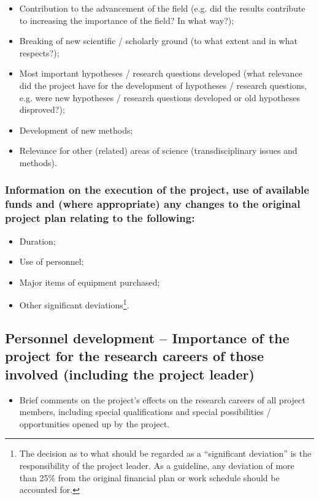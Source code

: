 \documentclass[a4paper, 11pt]{article}
\begin{document}
\begin{itemize}
\item Contribution to the advancement of the field (e.g. did the results contribute to
increasing the importance of the field? In what way?);
\item Breaking of new scientific / scholarly ground (to what extent and in what
respects?); 
\item Most important hypotheses / research questions developed (what relevance did the
project have for the development of hypotheses / research questions, e.g. were
new hypotheses / research questions developed or old hypotheses disproved?);
\item Development of new methods;
\item Relevance for other (related) areas of science (transdisciplinary issues and
methods).
\end{itemize}

\subsubsection{Information on the execution of the project, use of available funds and
(where appropriate) any changes to the original project plan relating to the
following:}

\begin{itemize}
\item Duration;
\item Use of personnel;
\item Major items of equipment purchased;
\item Other significant deviations\footnote{The decision as to what should be
regarded as a ``significant deviation'' is the responsibility of the project
leader.  As a guideline, any deviation of more than 25\% from the original
financial plan or work schedule should be accounted for.}.
\end{itemize}

\subsection{Personnel development – Importance of the project for the research
careers of those involved (including the project leader)}

\begin{itemize}
\item Brief comments on the project’s effects on the research careers of all project
members, including special qualifications and special possibilities /
opportunities opened up by the project.
\end{itemize}
\end{document}
